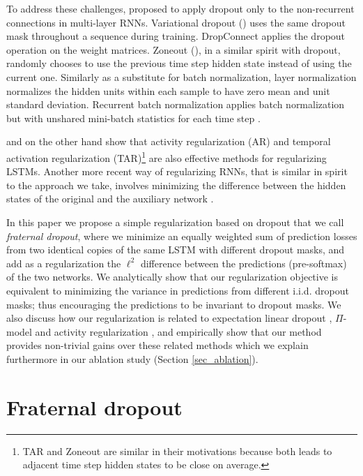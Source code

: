 \documentclass{article} \usepackage{iclr2018_conference,times}
\begin{document}
To address these challenges, \citet{zaremba2014recurrent} proposed to apply dropout only to the non-recurrent connections in multi-layer RNNs. Variational dropout (\cite{vdropout}) uses the same dropout mask throughout a sequence during training. DropConnect \citep{wan2013regularization} applies the dropout operation on the weight matrices. Zoneout (\cite{zoneout}), in a similar spirit with dropout, randomly chooses to use the previous time step hidden state instead of using the current one. Similarly as a substitute for batch normalization, layer normalization normalizes the hidden units within each sample to have zero mean and unit standard deviation. Recurrent batch normalization applies batch normalization but with unshared mini-batch statistics for each time step \citep{DBLP:journals/corr/CooijmansBLC16}.

\citet{merity2017regularizing} and \citet{ar_tar} on the other hand show that activity regularization (AR) and temporal activation regularization (TAR)\footnote{TAR and Zoneout are similar in their motivations because both leads to adjacent time step hidden states to be close on average.} are also effective methods for regularizing LSTMs. Another more recent way of regularizing RNNs, that is similar in spirit to the approach we take, involves minimizing the difference between the hidden states of the original and the auxiliary network \cite{serdyuk2017twinnet}.

In this paper we propose a simple regularization based on dropout that we call \emph{fraternal dropout}, where we minimize an equally weighted sum of prediction losses from two identical copies of the same LSTM with different dropout masks, and add as a regularization the $\ell^2$ difference between the predictions (pre-softmax) of the two networks. We analytically show that our regularization objective is equivalent to minimizing the variance in predictions from different i.i.d. dropout masks; thus encouraging the predictions to be invariant to dropout masks. We also discuss how our regularization is related to expectation linear dropout \cite{ma2016dropout}, $\Pi$-model \cite{laine2016temporal} and activity regularization \cite{ar_tar}, and empirically show that our method provides non-trivial gains over these related methods which we explain furthermore in our ablation study (Section \ref{sec_ablation}). 

\section{Fraternal dropout}
\label{sec_fd}
\end{document}
